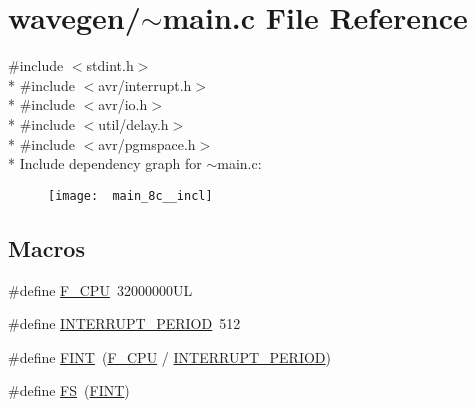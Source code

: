 \hypertarget{~main_8c}{\section{wavegen/$\sim$main.c File Reference}
\label{~main_8c}
}
{\ttfamily \#include $<$stdint.\-h$>$}\\*
{\ttfamily \#include $<$avr/interrupt.\-h$>$}\\*
{\ttfamily \#include $<$avr/io.\-h$>$}\\*
{\ttfamily \#include $<$util/delay.\-h$>$}\\*
{\ttfamily \#include $<$avr/pgmspace.\-h$>$}\\*
Include dependency graph for $\sim$main.c\-:\nopagebreak
\begin{figure}[H]
\begin{center}
\leavevmode
\texttt{[image: ~main\_8c\_\_incl]}
\end{center}
\end{figure}
\subsection*{Macros}
\begin{DoxyCompactItemize}
\item 
\#define \hyperlink{~main_8c_a43bafb28b29491ec7f871319b5a3b2f8}{F\-\_\-\-C\-P\-U}~32000000\-U\-L
\item 
\#define \hyperlink{~main_8c_a533f998159de957b1f91e571cda46b9c}{I\-N\-T\-E\-R\-R\-U\-P\-T\-\_\-\-P\-E\-R\-I\-O\-D}~512
\item 
\#define \hyperlink{~main_8c_abef1196c18f992aa76600b2fd4535bf9}{F\-I\-N\-T}~(\hyperlink{config_8h_a43bafb28b29491ec7f871319b5a3b2f8}{F\-\_\-\-C\-P\-U} / \hyperlink{~main_8c_a533f998159de957b1f91e571cda46b9c}{I\-N\-T\-E\-R\-R\-U\-P\-T\-\_\-\-P\-E\-R\-I\-O\-D})
\item 
\#define \hyperlink{~main_8c_a30588c5eca7c9cb6ebba02a0236f0119}{F\-S}~(\hyperlink{~main_8c_abef1196c18f992aa76600b2fd4535bf9}{F\-I\-N\-T})
\end{DoxyCompactItemize}
